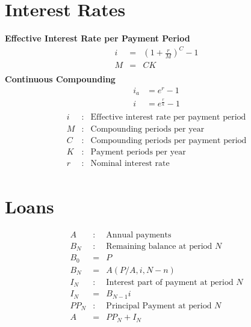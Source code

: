 \documentclass[landscape, letterpaper, 10pt]{article}
\begin{document}
\begin{multicols}{3}
    \section*{Interest Rates}
    \textbf{Effective Interest Rate per Payment Period}
    \begin{align*}
        i & = & \left(1+\frac{r}{M}\right)^C -1 \\
        M & = & CK                              \\
    \end{align*}
    \textbf{Continuous Compounding}
    \begin{align*}
        i_a & = e^r - 1           \\
        i   & = e^\frac{r}{k} - 1 \\
    \end{align*}
    \begin{align*}
        i & : & \text{Effective interest rate per payment period} \\
        M & : & \text{Compounding periods per year}               \\
        C & : & \text{Compounding periods per payment period}     \\
        K & : & \text{Payment periods per year}                   \\
        r & : & \text{Nominal interest rate}                      \\
    \end{align*}
    \section*{Loans}
    \begin{align*}
        A    & : & \text{Annual payments}                       \\
        B_N  & : & \text{Remaining balance at period } N        \\
        B_0  & = & P                                            \\
        B_N  & = & A(P/A, i, N-n)                               \\
        I_N  & : & \text{Interest part of payment at period } N \\
        I_N  & = & B_{N-1} i                                    \\
        PP_N & : & \text{Principal Payment at period } N        \\
        A    & = & PP_N + I_N                                   \\
    \end{align*}

\end{multicols}
\end{document}
